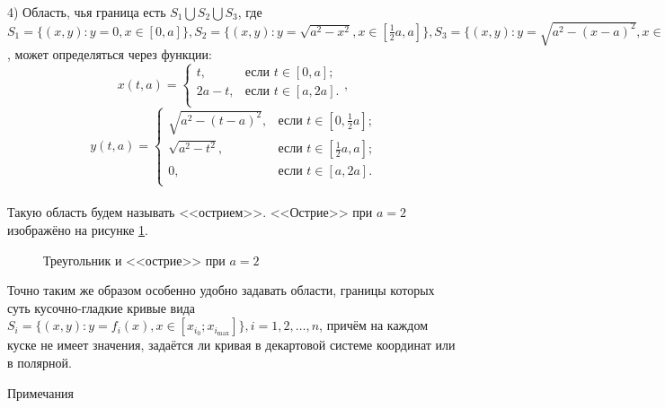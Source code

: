\documentclass[a4paper]{article}
\begin{document}
  4) Область, чья граница есть $S_1 \bigcup S_2 \bigcup S_3$, где $S_1=\{(x,y): y=0, x \in [0, a]\},S_2=\{(x,y): y=\sqrt{a^2-x^2}, x \in [\frac{1}{2}a, a]\},S_3=\{(x,y): y=\sqrt{a^2-(x-a)^2}, x \in [0,\frac{1}{2} a]\}$, может определяться через функции:
        \[
          x(t,a) =
          \begin{cases}
            t,    & \text{если $t \in [0,a]$;}  \\
            2a-t, & \text{если $t \in [a,2a]$.} \\
          \end{cases},
        \]
        \[y(t,a) =
          \begin{cases}
            \sqrt{a^2-(t-a)^2}, & \text{если $t \in [0,\frac{1}{2}a]$;} \\
            \sqrt{a^2-t^2},     & \text{если $t \in [\frac{1}{2}a,a]$;} \\
            0,                  & \text{если $t \in [a,2a]$.}           \\
          \end{cases}
        \]
        \\
        Такую область будем называть <<острием>>. <<Острие>> при $a=2$ изображёно на рисунке \ref{tros}.

        \begin{figure}[h!]
          \noindent{}
          \caption{Треугольник и <<острие>> при $a=2$}
          \label{tros}
        \end{figure}

Точно таким же образом особенно удобно задавать области, границы которых суть кусочно-гладкие кривые вида $S_i=\{(x,y): y=f_i(x), x \in [x_{i_0};x_{i_{\max}}]\}, i=1,2,\dots, n$, причём на каждом куске не имеет значения, задаётся ли кривая в декартовой системе координат или в полярной.

\FloatBarrier
Примечания
\end{document}
